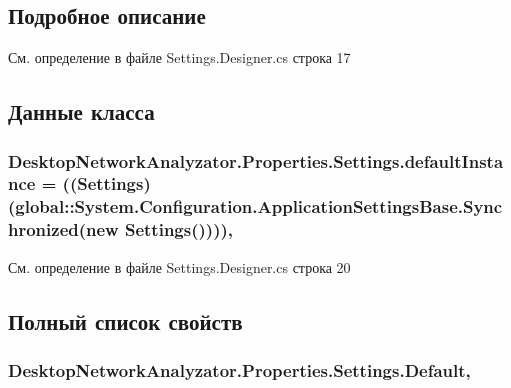 \subsection{Подробное описание}


См. определение в файле Settings.\+Designer.\+cs строка 17



\subsection{Данные класса}
\subsubsection[{\texorpdfstring{default\+Instance}{defaultInstance}}]{ Desktop\+Network\+Analyzator.\+Properties.\+Settings.\+default\+Instance = (({\bf Settings})(global\+::\+System.\+Configuration.\+Application\+Settings\+Base.\+Synchronized(new {\bf Settings}())))\hspace{0.3cm}{\ttfamily [static]}, {\ttfamily [private]}}\hypertarget{class_desktop_network_analyzator_1_1_properties_1_1_settings_a1e07630bdb590e81373cffcf2a89dc0e}{}\label{class_desktop_network_analyzator_1_1_properties_1_1_settings_a1e07630bdb590e81373cffcf2a89dc0e}


См. определение в файле Settings.\+Designer.\+cs строка 20



\subsection{Полный список свойств}
\subsubsection[{\texorpdfstring{Default}{Default}}]{ Desktop\+Network\+Analyzator.\+Properties.\+Settings.\+Default\hspace{0.3cm}{\ttfamily [static]}, {\ttfamily [get]}}\hypertarget{class_desktop_network_analyzator_1_1_properties_1_1_settings_a6a64ea634c250110524ee569f74fd502}{}\label{class_desktop_network_analyzator_1_1_properties_1_1_settings_a6a64ea634c250110524ee569f74fd502}


